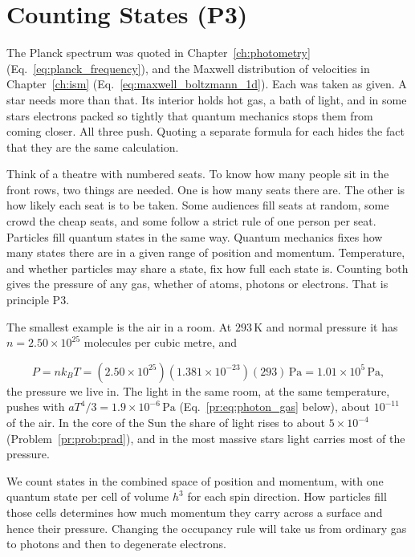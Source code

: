 \section{Counting States (P3)}
\label{pr:sec:p3}

The Planck spectrum was quoted in Chapter~\ref{ch:photometry} (Eq.~\eqref{eq:planck_frequency}), and the Maxwell distribution of velocities in Chapter~\ref{ch:ism} (Eq.~\eqref{eq:maxwell_boltzmann_1d}). Each was taken as given. A star needs more than that. Its interior holds hot gas, a bath of light, and in some stars electrons packed so tightly that quantum mechanics stops them from coming closer. All three push. Quoting a separate formula for each hides the fact that they are the same calculation.

Think of a theatre with numbered seats. To know how many people sit in the front rows, two things are needed. One is how many seats there are. The other is how likely each seat is to be taken. Some audiences fill seats at random, some crowd the cheap seats, and some follow a strict rule of one person per seat. Particles fill quantum states in the same way. Quantum mechanics fixes how many states there are in a given range of position and momentum. Temperature, and whether particles may share a state, fix how full each state is. Counting both gives the pressure of any gas, whether of atoms, photons or electrons. That is principle P3.

The smallest example is the air in a room. At $293\,\mathrm K$ and normal pressure it has $n=2.50\times10^{25}$ molecules per cubic metre, and

\[
P=nk_BT=(2.50\times10^{25})(1.381\times10^{-23})(293)\,\mathrm{Pa}=1.01\times10^{5}\,\mathrm{Pa},
\]
the pressure we live in. The light in the same room, at the same temperature, pushes with $aT^4/3=1.9\times10^{-6}\,\mathrm{Pa}$ (Eq.~\eqref{pr:eq:photon_gas} below), about $10^{-11}$ of the air. In the core of the Sun the share of light rises to about $5\times10^{-4}$ (Problem~\ref{pr:prob:prad}), and in the most massive stars light carries most of the pressure.

We count states in the combined space of position and momentum, with one quantum state per cell of volume $h^3$ for each spin direction. How particles fill those cells determines how much momentum they carry across a surface and hence their pressure. Changing the occupancy rule will take us from ordinary gas to photons and then to degenerate electrons.

